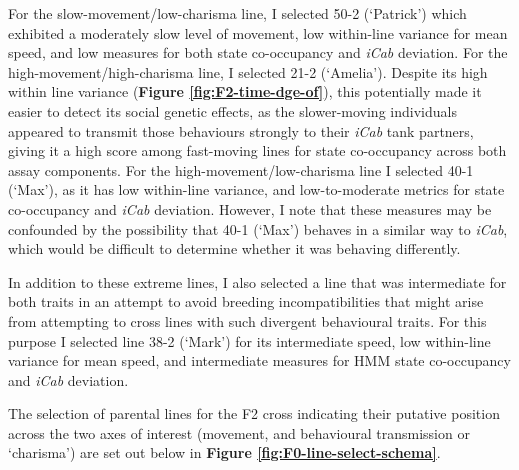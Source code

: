 \documentclass[
]{book}
\begin{document}
For the slow-movement/low-charisma line, I selected \textcolor{50-2 (‘Patrick’)_BB81FF}{50-2 (‘Patrick’)} which exhibited a moderately slow level of movement, low within-line variance for mean speed, and low measures for both state co-occupancy and \emph{\textcolor{iCab_424B4D}{iCab}} deviation. For the high-movement/high-charisma line, I selected \textcolor{21-2 (‘Amelia’)_49B500}{21-2 (‘Amelia’)}. Despite its high within line variance (\textbf{Figure \ref{fig:F2-time-dge-of}}), this potentially made it easier to detect its social genetic effects, as the slower-moving individuals appeared to transmit those behaviours strongly to their \emph{\textcolor{iCab_424B4D}{iCab}} tank partners, giving it a high score among fast-moving lines for state co-occupancy across both assay components. For the high-movement/low-charisma line I selected \textcolor{40-1 (‘Max’)_93AA00}{40-1 (‘Max’)}, as it has low within-line variance, and low-to-moderate metrics for state co-occupancy and \emph{\textcolor{iCab_424B4D}{iCab}} deviation. However, I note that these measures may be confounded by the possibility that \textcolor{40-1 (‘Max’)_93AA00}{40-1 (‘Max’)} behaves in a similar way to \emph{\textcolor{iCab_424B4D}{iCab}}, which would be difficult to determine whether it was behaving differently.

In addition to these extreme lines, I also selected a line that was intermediate for both traits in an attempt to avoid breeding incompatibilities that might arise from attempting to cross lines with such divergent behavioural traits. For this purpose I selected line \textcolor{38-2 (‘Mark’)_00C08B}{38-2 (‘Mark’)} for its intermediate speed, low within-line variance for mean speed, and intermediate measures for HMM state co-occupancy and \emph{\textcolor{iCab_424B4D}{iCab}} deviation.

The selection of parental lines for the F2 cross indicating their putative position across the two axes of interest (movement, and behavioural transmission or `charisma') are set out below in \textbf{Figure \ref{fig:F0-line-select-schema}}.
\end{document}
